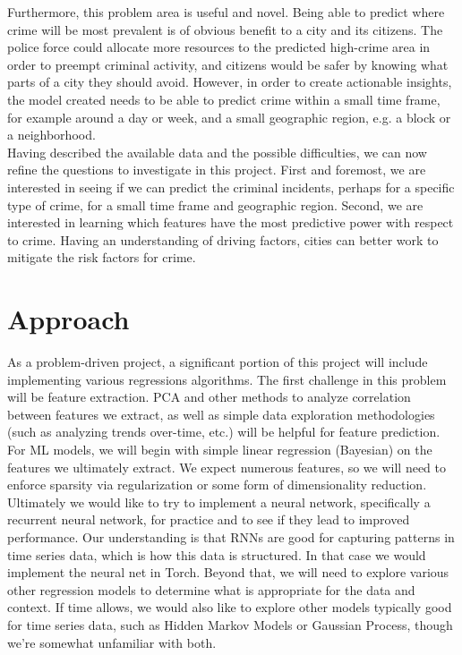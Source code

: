 \documentclass[10pt]{article}
\begin{document}
	Furthermore, this problem area is useful and novel. Being able to predict where crime will be most prevalent is of obvious benefit to a city and its citizens. The police force could allocate more resources to the predicted high-crime area in order to preempt criminal activity, and citizens would be safer by knowing what parts of a city they should avoid. However, in order to create actionable insights, the model created needs to be able to predict crime within a small time frame, for example around a day or week, and a small geographic region, e.g. a block or a neighborhood. \\
	
	Having described the available data and the possible difficulties, we can now refine the questions to investigate in this project. First and foremost, we are interested in seeing if we can predict the criminal incidents, perhaps for a specific type of crime, for a small time frame and geographic region. Second, we are interested in learning which features have the most predictive power with respect to crime. Having an understanding of driving factors, cities can better work to mitigate the risk factors for crime.

\section{Approach}
	As a problem-driven project, a significant portion of this project will include implementing various regressions algorithms. The first challenge in this problem will be feature extraction. PCA and other methods to analyze correlation between features we extract, as well as simple data exploration methodologies (such as analyzing trends over-time, etc.) will be helpful for feature prediction. \\
	
	For ML models, we will begin with simple linear regression (Bayesian) on the features we ultimately extract. We expect numerous features, so we will need to enforce sparsity via regularization or some form of dimensionality reduction. Ultimately we would like to try to implement a neural network, specifically a recurrent neural network, for practice and to see if they lead to improved performance. Our understanding is that RNNs are good for capturing patterns in time series data, which is how this data is structured. In that case we would implement the neural net in Torch. Beyond that, we will need to explore various other regression models to determine what is appropriate for the data and context. If time allows, we would also like to explore other models typically good for time series data, such as Hidden Markov Models or Gaussian Process, though we're somewhat unfamiliar with both. \\
	
\end{document}
